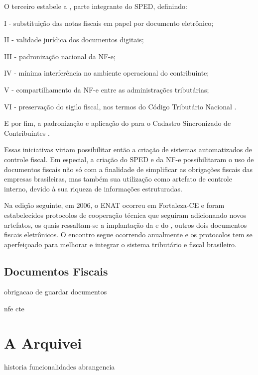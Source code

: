 O terceiro estabele a , parte integrante do SPED, definindo:

\begin{citacao}
I - substituição das notas fiscais em papel por documento eletrônico;

II - validade jurídica dos documentos digitais;

III - padronização nacional da NF-e;

IV - mínima interferência no ambiente operacional do contribuinte;

V - compartilhamento da NF-e entre as administrações tributárias;

VI - preservação do sigilo fiscal, nos termos do Código Tributário Nacional \cite{enat:2005:protocolo3}. 
\end{citacao}

E por fim, a padronização e aplicação do  para o Cadastro Sincronizado de Contribuintes \cite{enat:2005:protocolo4}.

Essas iniciativas viriam possibilitar então a criação de sistemas automatizados de controle fiscal. Em especial, a criação do SPED e da NF-e possibilitaram o uso de documentos fiscais não só com a finalidade de simplificar as obrigações fiscais das empresas brasileiras, mas também sua utilização como artefato de controle interno, devido à sua riqueza de informações estruturadas.

Na edição seguinte, em 2006, o ENAT ocorreu em Fortaleza-CE e foram estabelecidos protocolos de cooperação técnica que seguiram adicionando novos artefatos, os quais ressaltam-se a implantação da  e do , outros dois documentos fiscais eletrônicos. O encontro segue ocorrendo anualmente e os protocolos tem se aperfeiçoado para melhorar e integrar o sistema tributário e fiscal brasileiro.

\subsection{Documentos Fiscais}



obrigacao de guardar documentos

nfe
cte

\section{A Arquivei}

historia
funcionalidades
abrangencia
